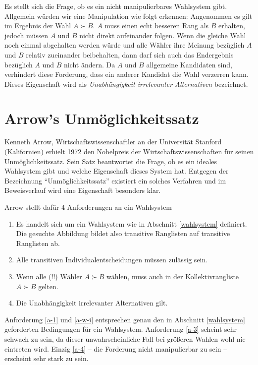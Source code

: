 \documentclass[BCOR5mm,DIV12,a4paper,10pt]{scrartcl}
\begin{document}
 
Es stellt sich die Frage, ob es ein nicht manipulierbares Wahlsystem gibt. Allgemein würden wir eine Manipulation wie folgt erkennen: Angenommen es gilt im Ergebnis der Wahl $A \succ B$. $A$ muss einen echt besseren Rang als $B$ erhalten, jedoch müssen $A$ und $B$ nicht direkt aufeinander folgen. Wenn die gleiche Wahl noch einmal abgehalten werden würde und alle Wähler ihre Meinung bezüglich $A$ und $B$ relativ zueinander beibehalten, dann darf sich auch das Endergebnis bezüglich $A$ und $B$ nicht ändern. Da $A$ und $B$ allgemeine Kandidaten sind, verhindert diese Forderung, dass ein anderer Kandidat die Wahl verzerren kann. Dieses Eigenschaft wird als \emph{Unabhängigkeit irrelevanter Alternativen} bezeichnet.


\section{Arrow's Unmöglichkeitssatz}
Kenneth Arrow, Wirtschaftswissenschaftler an der Universität Stanford (Kalifornien) erhielt 1972 den Nobelpreis der Wirtschaftswissenschaften für seinen Unmöglichkeitssatz. Sein Satz beantwortet die Frage, ob es ein ideales Wahlsystem gibt und welche Eigenschaft dieses System hat. Entgegen der Bezeichnung ``Unmöglichkeitssatz'' existiert ein solches Verfahren und im Beweisverlauf wird eine Eigenschaft besonders klar. 

Arrow stellt dafür $4$ Anforderungen an ein Wahlsystem
\begin{enumerate}
\item \label{a-1} Es handelt sich um ein Wahlsystem wie in Abschnitt \ref{wahlsystem} definiert. Die gesuchte Abbildung bildet also transitive Ranglisten auf transitive Ranglisten ab.
\item \label{a-w-i} Alle transitiven Individualentscheidungen müssen zulässig sein.
\item \label{a-3} Wenn alle (!!) Wähler $A \succ B$ wählen, muss auch in der Kollektivrangliste $A \succ B$ gelten.
\item \label{a-4} Die Unabhängigkeit irrelevanter Alternativen gilt.
\end{enumerate}

Anforderung \ref{a-1} und \ref{a-w-i} entsprechen genau den in Abschnitt \ref{wahlsystem} geforderten Bedingungen für ein Wahlsystem. Anforderung \ref{a-3} scheint sehr schwach zu sein, da dieser unwahrscheinliche Fall bei größeren Wahlen wohl nie eintreten wird. Einzig \ref{a-4} -- die Forderung nicht manipulierbar zu sein -- erscheint sehr stark zu sein.
\end{document}
